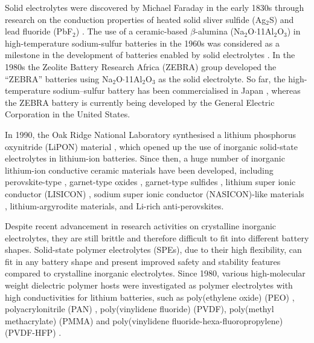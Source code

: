 \documentclass[../main.tex]{subfiles}
\begin{document}
Solid electrolytes were discovered by Michael Faraday in the early 1830s through research on the conduction properties of heated solid sliver sulfide (Ag$_{2}$S) and lead fluoride (PbF$_{2}$) \cite{Faraday1833}.  The use of a ceramic-based $\beta$-alumina (Na$_{2}$O$\cdot$11Al$_{2}$O$_{3}$) in high-temperature sodium-sulfur batteries in the 1960s was considered as a milestone in the development of batteries enabled by solid electrolytes \cite{armand2008building}. In the 1980s the Zeolite Battery Research Africa (ZEBRA) group developed the ``ZEBRA'' batteries using Na$_{2}$O$\cdot$11Al$_{2}$O$_{3}$ as the solid electrolyte. \cite{ZEBRA} So far, the high-temperature sodium–sulfur battery has been commercialised in Japan \cite{oshima2004}, whereas the ZEBRA battery is currently being developed by the General Electric Corporation in the United States. \cite{capasso2014} 

In 1990, the Oak Ridge National Laboratory synthesised a lithium phosphorus oxynitride (LiPON) material \cite{dudney1992,bates1992}, which opened up the use of inorganic solid-state electrolytes in lithium-ion batteries. Since then, a huge number of inorganic lithium-ion conductive ceramic materials have been developed, including perovskite-type \cite{inaguma1993}, garnet-type oxides \cite{kasper1969,mazza1988}, garnet-type sulfides \cite{kennedy1986}, lithium super ionic conductor (LISICON) \cite{ivanov1988}, sodium super ionic conductor (NASICON)-like materials \cite{lang2015}, lithium-argyrodite materials, \cite{deklerk2016} and Li-rich anti-perovskites. \cite{dawson2018elucidating,ahiavi2020mechanochemical}

Despite recent advancement in research activities on crystalline inorganic electrolytes, they are still brittle and therefore difficult to fit into different battery shapes. Solid-state polymer electrolytes (SPEs), due to their high flexibility, can fit in any battery shape and present improved safety and stability features compared to crystalline inorganic electrolytes. \cite{DIRICAN201927} Since 1980, various high-molecular weight dielectric polymer hosts were investigated as polymer electrolytes with high conductivities for lithium batteries, such as poly(ethylene oxide) (PEO) \cite{fenton1973}, polyacrylonitrile (PAN) \cite{abraham1990,dautzenberg1994}, poly(vinylidene fluoride) (PVDF), \cite{arcella1999,kataoka2000,li2016} poly(methyl methacrylate) (PMMA) \cite{appetecchi1995,bohnke1993} and poly(vinylidene fluoride-hexa-fluoropropylene) (PVDF-HFP) \cite{abbrent2001,park2008,yang2014}.
\end{document}
